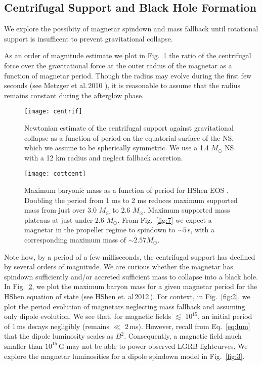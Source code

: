 \documentclass{article}
\begin{document}
\subsection{Centrifugal Support and Black Hole Formation}\label{sec:magend}

We explore the possibity of magnetar spindown and mass fallback until rotational support is insufficent to prevent gravitational collapse.

As an order of magnitude estimate we plot in Fig.~\ref{fig:1} the ratio of the centrifugal force over the gravitational force at the outer radius of the magnetar as a function of magnetar period. Though the radius may evolve during the first few seconds (see Metzger et al.\,2010 \cite{Metzger:2010pp}), it is reasonable to assume that the radius remains constant during the afterglow phase.

\begin{figure}[h!]
\centering
\texttt{[image: centrif]}
\caption{Newtonian estimate of the centrifugal support against gravitational collapse as a function of period on the equatorial surface of the NS, which we assume to be spherically symmetric. We use a 1.4 $M_{\odot}$ NS with a 12 km radius and neglect fallback accretion.}
\label{fig:1}
\end{figure}

\begin{figure}[h!]
\centering
\texttt{[image: cottcent]}
\caption{Maximum baryonic mass as a function of period for HShen EOS \cite{HShen:2012ap}. Doubling the period from 1 ms to 2 ms reduces maximum supported mass from just over 3.0 $M_{\odot}$ to 2.6 $M_{\odot}$. Maximum supported mass plateaus at just under 2.6 $M_{\odot}$. From Fig.~\ref{fig:7} we expect a magnetar in the propeller regime to spindown to $\sim 5$\,s,  with a corresponding maximum mass of $\sim 2.57 M_{\odot}$.}
\label{fig:0}
\end{figure}

Note how, by a period of a few milliseconds, the centrifugal support has declined by several orders of magnitude. We are curious whether the magnetar has spindown sufficiently and/or accreted sufficient mass to collapse into a black hole. In Fig.~\ref{fig:0}, we plot the maximum baryon mass for a given magnetar period for the HShen equation of state (see HShen et. al\,2012\,\cite{HShen:2012ap}). For context, in Fig.~\ref{fig:2}, we plot the period evolution of magnetars neglecting mass fallback and assuming only dipole evolution. We see that, for magnetic fields $\lesssim$ $10^{15}$, an initial period of 1\,ms decays negligibly (remains $\ll$ 2\,ms). However, recall from Eq.~\ref{eq:lum} that the dipole luminosity scales as $B^{2}$. Consequently, a magnetic field much smaller than $10^{15}$\,G may not be able to power observed LGRB lightcurves. We explore the magnetar luminosities for a dipole spindown model in Fig.~\ref{fig:3}.
\end{document}
